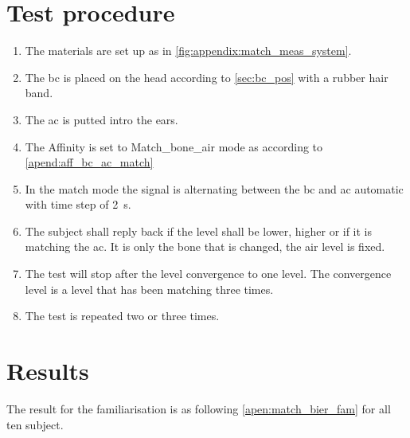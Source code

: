 \section*{Test procedure}


\begin{enumerate}
\item The materials are set up as in \autoref{fig:appendix:match_meas_system}.
\item The \gls{bc} is placed on the head according to \autoref{sec:bc_pos} with a rubber hair band.
\item The \gls{ac} is putted intro the ears.
\item The Affinity is set to Match_bone_air mode as according to \autoref{apend:aff_bc_ac_match} 
\item In the match mode the signal is alternating between the \gls{bc} and \gls{ac} automatic with time step of \SI{2}{\second}.
\item The  subject shall reply back if the level shall be lower, higher or if it is matching  the \gls{ac}. It is only the bone that is changed, the air level is fixed.
\item The test will stop after the level convergence to one level. The convergence level is a level that has been matching three times.
\item The test is repeated two or three times.
\end{enumerate}

\section*{Results}

The result for the familiarisation is as following \autoref{apen:match_bier_fam} for all ten subject. 

